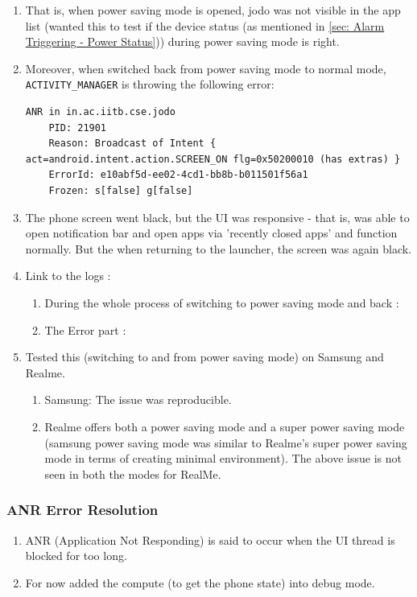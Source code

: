 \documentclass{article}
\begin{document}
\begin{enumerate}
    \item That is, when power saving mode is opened, jodo was not visible in the app list (wanted this to test if the device status (as mentioned in \ref{sec: Alarm Triggering - Power Status})) during power saving mode is right.
    \item Moreover, when switched back from power saving mode to normal mode, \texttt{ACTIVITY\_MANAGER} is throwing the following error: 
    
\begin{lstlisting}[caption={ANR Error when returning from power saving mode},label={label: ANR Error when returning from power saving mode}]
    ANR in in.ac.iitb.cse.jodo
    PID: 21901
    Reason: Broadcast of Intent { act=android.intent.action.SCREEN_ON flg=0x50200010 (has extras) }
    ErrorId: e10abf5d-ee02-4cd1-bb8b-b011501f56a1
    Frozen: s[false] g[false]
 \end{lstlisting}

    \item The phone screen went black, but the UI was responsive - that is, was able to open notification bar and open apps via 'recently closed apps' and function normally. But the when returning to the launcher, the screen was again black.
    \item Link to the logs :
    \begin{enumerate}
        \item During the whole process of switching to power saving mode and back : 
        \item The Error part : 
    \end{enumerate}
    \item Tested this (switching to and from power saving mode) on Samsung and Realme. 
    \begin{enumerate}
        \item Samsung: The issue was reproducible.
        \item Realme offers both a power saving mode and a super power saving mode (samsung power saving mode was similar to Realme's super power saving mode in terms of creating minimal environment). The above issue is not seen in both the modes for RealMe.
    \end{enumerate}

\end{enumerate}

\subsubsection{ANR Error Resolution}
\begin{enumerate}
    \item ANR (Application Not Responding) is said to occur when the UI thread is blocked for too long. 
    \item For now added the compute (to get the phone state) into debug mode. 
\end{enumerate}
\end{document}
